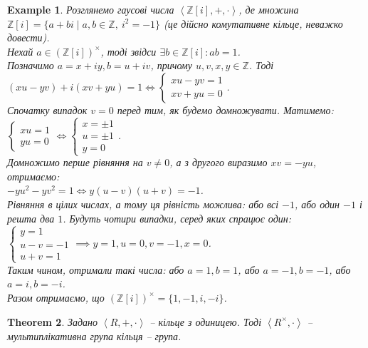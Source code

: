 \documentclass[a4paper, 10pt]{article}
\theoremstyle{theoremdd}
\newtheorem{theorem}{Theorem}[subsection]
\theoremstyle{theoremdd}
\theoremstyle{theoremdd}
\theoremstyle{theoremdd}
\theoremstyle{theoremdd}
\newtheorem{example}[theorem]{Example}
\theoremstyle{theoremdd}
\theoremstyle{theoremdd}
\theoremstyle{theoremdd}
\theoremstyle{theoremdd}
\theoremstyle{theoremdd}
\theoremstyle{theoremdd}
\theoremstyle{theoremdd}
\theoremstyle{theoremdd}
\theoremstyle{theoremdd}
\theoremstyle{theoremdd}
\begin{document}
\begin{example}
Розглянемо гаусові числа $\left< \mathbb{Z}[i], +, \cdot \right>$, де множина $\mathbb{Z}[i] = \{ a + bi \mid a,b \in \mathbb{Z},\ i^2 = -1 \}$ (це дійсно комутативне кільце, неважко довести).\\
Нехай $a \in (\mathbb{Z}[i])^\times$, тоді звідси $\exists b \in \mathbb{Z}[i]: ab = 1$.\\
Позначимо $a = x+iy, b = u+iv$, причому $u,v,x,y \in \mathbb{Z}$. Тоді\\
$(xu-yv) + i(xv+yu) = 1 \iff \begin{cases} xu - yv = 1 \\ xv + yu = 0 \end{cases}$.\\
Спочатку випадок $v = 0$ перед тим, як будемо домножувати. Матимемо:\\
$\begin{cases} xu = 1 \\ yu = 0 \end{cases} \iff \begin{cases} x = \pm 1 \\ u = \pm 1 \\ y = 0 \end{cases}$.\\
Домножимо перше рівняння на $v \neq 0$, а з другого виразимо $xv = -yu$, отримаємо:\\
$-yu^2 - yv^2 = 1 \iff y(u-v)(u+v) = -1$.\\
Рівняння в цілих числах, а тому ця рівність можлива: або всі $-1$, або один $-1$ і решта два $1$. Будуть чотири випадки, серед яких спрацює один:\\
$\begin{cases} 
y = 1 \\
u - v = -1 \\
u + v = 1
\end{cases} \implies y = 1, u = 0, v = -1, x = 0$.\\
Таким чином, отримали такі числа: або $a = 1, b = 1$, або $a = -1, b = -1$, або $a = i, b = -i$.\\
Разом отримаємо, що $(\mathbb{Z}[i])^\times = \{1,-1,i,-i\}$.
\end{example}

\begin{theorem}
Задано $\left<R,+,\cdot \right>$ -- кільце з одиницею. Тоді $\left<R^\times, \cdot \right>$ -- мультиплікативна група кільця -- група.
\end{theorem}
\end{document}
